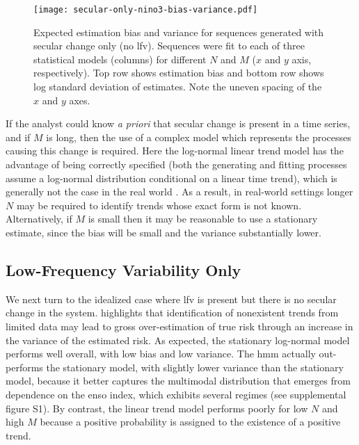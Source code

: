 \documentclass[
  draft,
  linenumbers
]{agujournal2019}
\begin{document}
\begin{figure}
  \centering
  \texttt{[image: secular-only-nino3-bias-variance.pdf]}
  \caption{
    Expected estimation bias and variance for sequences generated with secular change only (no \gls{lfv}).
    Sequences were fit to each of three statistical models (columns) for different $N$ and $M$ ($x$ and $y$ axis, respectively).
    Top row shows estimation bias and bottom row shows log standard deviation of estimates.
    Note the uneven spacing of the $x$ and $y$ axes.
  }\label{fig:secular-nino3-bias-variance}
\end{figure}

If the analyst could know \emph{a priori} that secular change is present in a time series, and if $M$ is long, then the use of a complex model which represents the processes causing this change is required.
Here the log-normal linear trend model has the advantage of being correctly specified (both the generating and fitting processes assume a log-normal distribution conditional on a linear time trend), which is generally not the case in the real world \citep{Montanari:2014hl,Serinaldi:2015bq}.
As a result, in real-world settings longer $N$ may be required to identify trends whose exact form is not known.
Alternatively, if $M$ is small then it may be reasonable to use a stationary estimate, since the bias will be small and the variance substantially lower.

\subsection{Low-Frequency Variability Only}

We next turn to the idealized case where  \gls{lfv} is present but there is no secular change in the system.
 highlights that identification of nonexistent trends from limited data may lead to gross over-estimation of true risk through an increase in the variance of the estimated risk.
As expected, the stationary log-normal model performs well overall, with low bias and low variance.
The \gls{hmm} actually out-performs the stationary model, with slightly lower variance than the stationary model, because it better captures the multimodal distribution that emerges from dependence on the \gls{enso} index, which exhibits several regimes (see supplemental figure S1).
By contrast, the linear trend model performs poorly for low $N$ and high $M$ because a positive probability is assigned to the existence of a positive trend.
\end{document}
